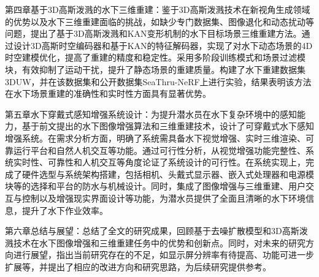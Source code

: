 第四章基于3D高斯泼溅的水下三维重建：鉴于3D高斯泼溅技术在新视角生成领域的优势以及水下三维重建面临的挑战，如缺少专门数据集、图像退化和动态扰动等问题，提出了基于3D高斯泼溅和KAN变形机制的水下目标场景三维重建方法。通过设计3D高斯时空编码器和基于KAN的特征解码器，实现了对水下动态场景的4D时空建模优化，提高了重建的精度和稳定性。采用多阶段训练模式和场景过滤模块，有效抑制了运动干扰，提升了静态场景的重建质量。构建了水下重建数据集3DUW，并在该数据集和公开数据集SeaThru-NeRF上进行实验，结果表明该方法在水下场景重建的准确性和实时性方面具有显著优势。

第五章水下穿戴式感知增强系统设计：为提升潜水员在水下复杂环境中的感知能力，基于前文提出的水下图像增强算法和三维重建技术，设计了可穿戴式水下感知增强系统。在需求分析方面，明确了系统需具备水下视觉增强、实时三维渲染、可靠运行平台和自然人机交互等功能。通过可行性分析，从视觉增强功能完整性、系统实时性、可靠性和人机交互等角度论证了系统设计的可行性。在系统实现上，完成了硬件选型与系统架构搭建，包括相机、头戴式显示器、嵌入式处理器和电源模块等的选择和平台的防水与机械设计。同时，集成了图像增强与三维重建、用户交互与控制以及增强现实界面设计等功能，为潜水员提供了全面且清晰的水下环境信息，提升了水下作业效率。

第六章总结与展望：总结了全文的研究成果，回顾基于去噪扩散模型和3D高斯泼溅技术在水下图像增强和三维重建任务中的优势和创新点。同时，对未来的研究方向进行展望，指出当前研究存在的不足，如显示屏分辨率有待提高、功能可进一步扩展等，并提出了相应的改进方向和研究思路，为后续研究提供参考。 
